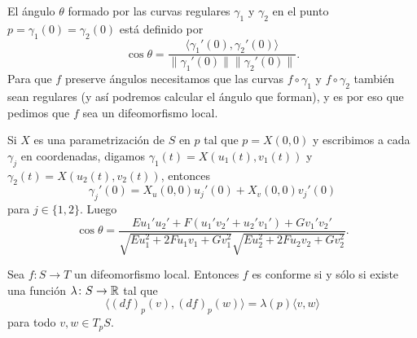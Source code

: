El ángulo $\theta$ formado por las curvas regulares $\gamma_1$ y $\gamma_2$ en
el punto $p=\gamma_1(0)=\gamma_2(0)$ está definido por
\[
	\cos\theta=\frac{\langle \gamma_1'(0),\gamma_2'(0)\rangle}{\|\gamma_1'(0)\|\|\gamma_2'(0)\|}.
\]
Para que $f$ preserve ángulos necesitamos que las curvas $f\circ\gamma_1$ y
$f\circ\gamma_2$ también sean regulares (y así podremos calcular el ángulo que
forman), y es por eso que pedimos que $f$ sea un difeomorfismo local.

Si $X$ es una parametrización de $S$ en $p$ tal que $p=X(0,0)$ y escribimos a
cada $\gamma_j$ en coordenadas, digamos 
$\gamma_1(t)=X(u_1(t),v_1(t))$ y 
$\gamma_2(t)=X(u_2(t),v_2(t))$, 
entonces 
\[
\gamma_j'(0)=X_u(0,0)u_j'(0)+X_v(0,0)v_j'(0)
\]
para $j\in\{1,2\}$. Luego
\[
	\cos\theta=\frac{Eu_1'u_2'+F(u_1'v_2'+u_2'v_1')+Gv_1'v_2'}{\sqrt{Eu_1^2+2Fu_1v_1+Gv_1^2}\sqrt{Eu_2^2+2Fu_2v_2+Gv_2^2}}.
\]

\begin{lemma}
	Sea $f\colon S\to T$ un difeomorfismo local. Entonces $f$ es conforme si y
	sólo si existe una función $\lambda\colon S\to\mathbb{R}$ tal que 
	\[
		\langle (df)_p(v),(df)_p(w)\rangle=\lambda(p)\langle v,w\rangle
	\]
	para todo $v,w\in T_pS$. 
\end{lemma}

